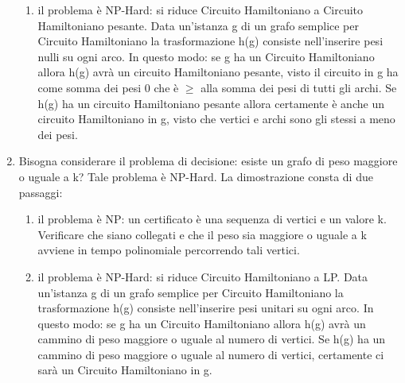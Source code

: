 \documentclass[a4paper,11pt]{article}
\begin{document}
\begin{enumerate}
\begin{enumerate}
    \item il problema è NP-Hard: si riduce Circuito Hamiltoniano a Circuito Hamiltoniano pesante. Data un'istanza g di un grafo semplice per Circuito Hamiltoniano la trasformazione h(g) consiste nell'inserire pesi nulli su ogni arco. In questo modo: se g ha un Circuito Hamiltoniano allora h(g) avrà un circuito Hamiltoniano pesante, visto il circuito in g ha come somma dei pesi 0 che è $\geq$ alla somma dei pesi di tutti gli archi. Se h(g) ha un circuito Hamiltoniano pesante allora certamente è anche un circuito Hamiltoniano in g, visto che vertici e archi sono gli stessi a meno dei pesi.
    \end{enumerate}
    \item Bisogna considerare il problema di decisione: esiste un grafo di peso maggiore o uguale a k? Tale problema è NP-Hard. La dimostrazione consta di due passaggi:
    \begin{enumerate}
        \item il problema è NP: un certificato è una sequenza di vertici e un valore k. Verificare che siano collegati e che il peso sia maggiore o uguale a k avviene in tempo polinomiale percorrendo tali vertici.
        \item il problema è NP-Hard: si riduce Circuito Hamiltoniano a LP. Data un'istanza g di un grafo semplice per Circuito Hamiltoniano la trasformazione h(g) consiste nell'inserire pesi unitari su ogni arco. In questo modo: se g ha un Circuito Hamiltoniano allora h(g) avrà un cammino di peso maggiore o uguale al numero di vertici. Se h(g) ha un cammino di peso maggiore o uguale al numero di vertici, certamente ci sarà un Circuito Hamiltoniano in g.
    \end{enumerate}
\end{enumerate}



\end{document}
